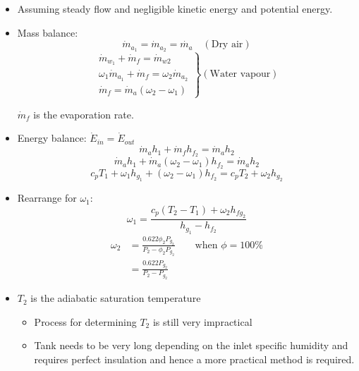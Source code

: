 \documentclass[11pt]{article}
\begin{document}
\begin{itemize}
\item Assuming steady flow and negligible kinetic energy and potential energy.
\item Mass balance:
\[\dot{m}_{a_1} = \dot{m}_{a_2} = \dot{m_a} \quad (\text{Dry air})\]
\begin{displaymath}
\left. \begin{array}{c}
\dot{m}_{w_1} + \dot{m}_f = \dot{m}_{w2} \\
\omega_1 \dot{m}_{a_1} + \dot{m}_f = \omega_2 \dot{m}_{a_2} \\
\dot{m}_f = \dot{m}_a (\omega_2 - \omega_1)
\end{array} \right\} (\text{Water vapour})
\end{displaymath}

\(\dot{m}_f\) is the evaporation rate.

\item Energy balance: \(\dot{E}_{in} = \dot{E}_{out}\)
\[\dot{m}_a h_1 + \dot{m}_f h_{f_2} = \dot{m}_a h_2\]
\[\dot{m}_a h_1 + \dot{m}_a (\omega_2 - \omega_1) h_{f_2} = \dot{m}_a h_2\]
\[c_p T_1 + \omega_1 h_{g_1} + (\omega_2 - \omega_1) h_{f_2} = c_p T_2 + \omega_2 h_{g_2}\]

\item Rearrange for \(\omega_1\):
\[\omega_1 = \frac{c_p (T_2 - T_1) + \omega_2 h_{fg_2}}{h_{g_1} - h_{f_2}}\]
\begin{align*}
\omega_2 &= \frac{0.622 \phi_2 P_{g_2}}{P_2 - \phi_2 P_{g_2}} \qquad \text{when } \phi = 100\% \\
&= \frac{0.622 P_{g_2}}{P_2 - P_{g_2}}
\end{align*}

\item \(T_2\) is the adiabatic saturation temperature
\begin{itemize}
\item Process for determining \(T_2\) is still very impractical
\item Tank needs to be very long depending on the inlet specific humidity and requires perfect insulation and hence a more practical method is required.
\end{itemize}
\end{itemize}
\end{document}
